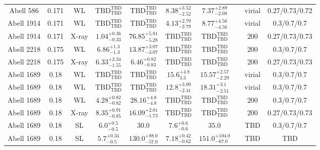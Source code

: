 \begin{table}
\begin{tabular}{cccccccccc}
Abell 586 & 0.171 & WL & ${\mathrm{TBD}}^{\mathrm{TBD}}_{\mathrm{TBD}}$ & ${\mathrm{TBD}}^{\mathrm{TBD}}_{\mathrm{TBD}}$ & ${8.38}^{+3.52}_{-2.52}$ & ${7.37}^{+2.89}_{-2.08}$ & \citet{OK10.1} & virial & 0.27/0.73/0.72 \\
Abell 1914 & 0.171 & WL & ${\mathrm{TBD}}^{\mathrm{TBD}}_{\mathrm{TBD}}$ & ${\mathrm{TBD}}^{\mathrm{TBD}}_{\mathrm{TBD}}$ & ${4.13}^{+2.79}_{-2.79}$ & ${8.77}^{+4.56}_{-4.56}$ & \citet{OK08.1} & virial & 0.3/0.7/0.7 \\
Abell 1914 & 0.171 & X-ray & ${1.04}^{+0.36}_{-0.33}$ & ${76.85}^{+5.81}_{-5.28}$ & ${\mathrm{TBD}}^{\mathrm{TBD}}_{\mathrm{TBD}}$ & ${\mathrm{TBD}}^{\mathrm{TBD}}_{\mathrm{TBD}}$ & \citet{BA14.1} & 200 & 0.27/0.73/0.73 \\
Abell 2218 & 0.175 & WL & ${6.86}^{+1.3}_{-1.3}$ & ${13.87}^{+3.07}_{-3.07}$ & ${\mathrm{TBD}}^{\mathrm{TBD}}_{\mathrm{TBD}}$ & ${\mathrm{TBD}}^{\mathrm{TBD}}_{\mathrm{TBD}}$ & \citet{BA07.1} & 200 & 0.3/0.7/0.7 \\
Abell 2218 & 0.175 & X-ray & ${6.33}^{+2.34}_{-1.55}$ & ${6.46}^{+0.82}_{-0.83}$ & ${\mathrm{TBD}}^{\mathrm{TBD}}_{\mathrm{TBD}}$ & ${\mathrm{TBD}}^{\mathrm{TBD}}_{\mathrm{TBD}}$ & \citet{BA14.1} & 200 & 0.27/0.73/0.73 \\
Abell 1689 & 0.18 & WL & ${\mathrm{TBD}}^{\mathrm{TBD}}_{\mathrm{TBD}}$ & ${\mathrm{TBD}}^{\mathrm{TBD}}_{\mathrm{TBD}}$ & ${15.6}^{+4.8}_{3.3}$ & ${15.57}^{+2.57}_{-2.29}$ & \citet{UM09.1} & virial & 0.3/0.7/0.7 \\
Abell 1689 & 0.18 & WL & ${\mathrm{TBD}}^{\mathrm{TBD}}_{\mathrm{TBD}}$ & ${\mathrm{TBD}}^{\mathrm{TBD}}_{\mathrm{TBD}}$ & ${12.8}^{+3.09}_{-2.41}$ & ${18.31}^{+3.1}_{-2.51}$ & \citet{UM11.1} & virial & 0.3/0.7/0.7 \\
Abell 1689 & 0.18 & WL & ${4.28}^{+0.82}_{-0.82}$ & ${28.16}^{+4.8}_{-4.8}$ & ${\mathrm{TBD}}^{\mathrm{TBD}}_{\mathrm{TBD}}$ & ${\mathrm{TBD}}^{\mathrm{TBD}}_{\mathrm{TBD}}$ & \citet{BA07.1} & 200 & 0.3/0.7/0.7 \\
Abell 1689 & 0.18 & X-ray & ${8.35}^{+0.91}_{-0.85}$ & ${16.09}^{+2.81}_{-1.73}$ & ${\mathrm{TBD}}^{\mathrm{TBD}}_{\mathrm{TBD}}$ & ${\mathrm{TBD}}^{\mathrm{TBD}}_{\mathrm{TBD}}$ & \citet{BA14.1} & 200 & 0.27/0.73/0.73 \\
Abell 1689 & 0.18 & SL & ${6.0}^{+0.5}_{-0.5}$ & ${30.0}^{}_{}$ & ${7.6}^{+0.6}_{-0.6}$ & ${35.0}^{}_{}$ & \citet{HA06.1} & TBD & 0.3/0.7/0.7 \\
Abell 1689 & 0.18 & SL & ${5.7}^{+0.34}_{-0.5}$ & ${130.0}^{+88.0}_{-57.0}$ & ${7.18}^{+0.42}_{-0.62}$ & ${151.0}^{+104.0}_{-67.0}$ & \citet{ZE06.1} & TBD & TBD \\

\end{tabular}
\end{table}
